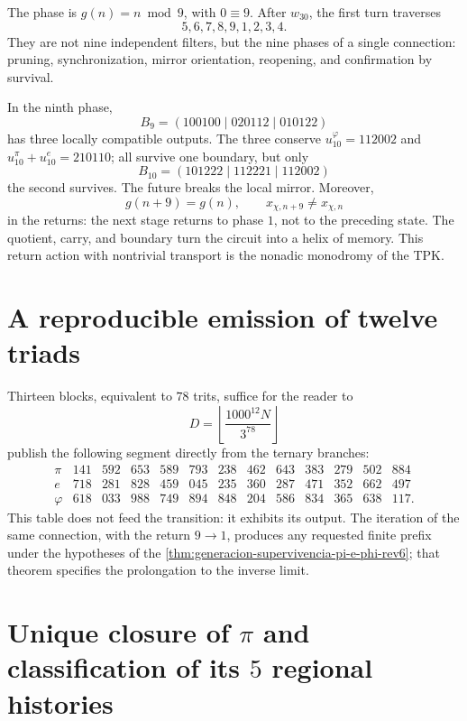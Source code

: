 The phase is \(g(n)=n\bmod9\), with \(0\equiv9\). After \(w_{30}\), the
first turn traverses
\[
5,6,7,8,9,1,2,3,4.
\]
They are not nine independent filters, but the nine phases of a single
connection: pruning, synchronization, mirror orientation, reopening, and
confirmation by survival.

In the ninth phase,
\[
B_9=(100100\mid020112\mid010122)
\]
has three locally compatible outputs. The three conserve
\(u_{10}^\varphi=112002\) and
\(u_{10}^\pi+u_{10}^e=210110\); all survive one boundary, but only
\[
\boxed{B_{10}=(101222\mid112221\mid112002)}
\]
the second survives. The future breaks the local mirror. Moreover,
\[
g(n+9)=g(n),\qquad x_{\chi,n+9}\ne x_{\chi,n}
\]
in the returns: the next stage returns to phase \(1\), not to the
preceding state. The quotient, carry, and boundary turn the circuit into a
helix of memory. This return action with nontrivial transport is the
nonadic monodromy of the TPK.

\section{A reproducible emission of twelve triads}

Thirteen blocks, equivalent to \(78\) trits, suffice for the reader to
\[
D=\left\lfloor\frac{1000^{12}N}{3^{78}}\right\rfloor
\]
publish the following segment directly from the ternary branches:
\[
\begin{array}{c|rrrrrrrrrrrr}
\pi&141&592&653&589&793&238&462&643&383&279&502&884\\
e&718&281&828&459&045&235&360&287&471&352&662&497\\
\varphi&618&033&988&749&894&848&204&586&834&365&638&117.
\end{array}
\]
This table does not feed the transition: it exhibits its output. The iteration of the
same connection, with the return \(9\to1\), produces any requested finite prefix
under the hypotheses of the
\cref{thm:generacion-supervivencia-pi-e-phi-rev6}; that theorem specifies the
prolongation to the inverse limit.

\section{Unique closure of \texorpdfstring{\(\pi\)}{pi} and classification of its \(5\) regional histories}

